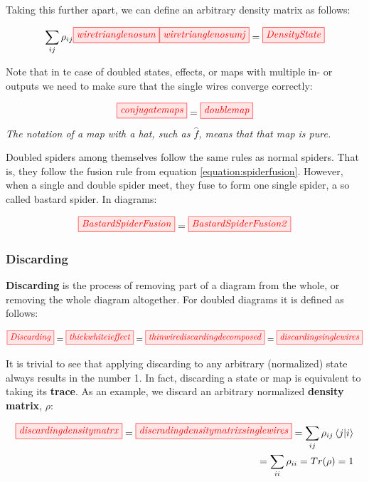 \documentclass[]{article}
\begin{document}
Taking this further apart, we can define an arbitrary density matrix as follows:

\begin{equation}
	 \sum\limits_{ij} \rho_{ij} \tikzfig{wiretrianglenosum} \tikzfig{wiretrianglenosumj} = \tikzfig{DensityState}
\end{equation}

Note that in te case of doubled states, effects, or maps with multiple in- or outputs we need to make sure that the single wires converge correctly:

\begin{equation}
\tikzfig{conjugatemaps} = \tikzfig{doublemap}
\end{equation}
\textit{The notation of a map with a hat, such as $\hat{f}$, means that that map is pure.}

Doubled spiders among themselves follow the same rules as normal spiders. That is, they follow the fusion rule from equation \ref{equation:spiderfusion}. However, when a single and double spider meet, they fuse to form one single spider, a so called bastard spider. In diagrams:

\begin{equation}
	\tikzfig{BastardSpiderFusion} = \tikzfig{BastardSpiderFusion2}
\end{equation}

\subsubsection{Discarding}
\label{discarding}

\textbf{Discarding} is the process of removing part of a diagram from the whole, or removing the whole diagram altogether. For doubled diagrams it is defined as follows:

\begin{equation}
\label{discarding}
\tikzfig{Discarding} = \tikzfig{thickwhiteieffect} = \tikzfig{thinwirediscardingdecomposed} = \tikzfig{discardingsinglewires} 
\end{equation}

It is trivial to see that applying discarding to any arbitrary (normalized) state always results in the number 1. In fact, discarding a state or map is equivalent to taking its \textbf{trace}. As an example, we discard an arbitrary normalized \textbf{density matrix}, $\rho$:

\begin{equation}
\label{equation:discarding}
\begin{split}
\tikzfig{discardingdensitymatrx} = \tikzfig{discradingdensitymatrixsinglewires} = \sum\limits_{ij} \rho_{ij} \bra{j}\ket{i} \\ = \sum\limits_{ii} \rho_{ii} = Tr(\rho) = 1
\end{split}
\end{equation}
\end{document}
